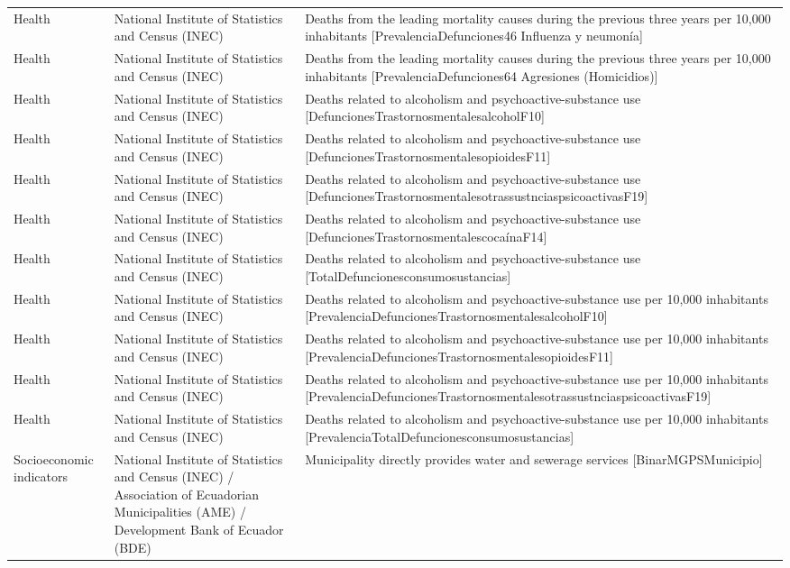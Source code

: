 \documentclass[10pt,a4paper]{article}
\begin{document}
\begin{longtable}{@{}>{\raggedright\arraybackslash}p{3.5cm}>{\raggedright\arraybackslash}p{5.6cm}>{\raggedright\arraybackslash}p{\dimexpr\textwidth-9.1cm-4\tabcolsep\relax}@{}}
Health & National Institute of Statistics and Census (INEC) & Deaths from the leading mortality causes during the previous three years per 10,000 inhabitants [PrevalenciaDefunciones46 Influenza y neumon\'{i}a]\\
Health & National Institute of Statistics and Census (INEC) & Deaths from the leading mortality causes during the previous three years per 10,000 inhabitants [PrevalenciaDefunciones64 Agresiones (Homicidios)]\\
Health & National Institute of Statistics and Census (INEC) & Deaths related to alcoholism and psychoactive-substance use [DefuncionesTrastornosmentalesalcoholF10]\\
Health & National Institute of Statistics and Census (INEC) & Deaths related to alcoholism and psychoactive-substance use [DefuncionesTrastornosmentalesopioidesF11]\\
Health & National Institute of Statistics and Census (INEC) & Deaths related to alcoholism and psychoactive-substance use [DefuncionesTrastornosmentalesotrassustnciaspsicoactivasF19]\\
Health & National Institute of Statistics and Census (INEC) & Deaths related to alcoholism and psychoactive-substance use [DefuncionesTrastornosmentalescoca\'{i}naF14]\\
Health & National Institute of Statistics and Census (INEC) & Deaths related to alcoholism and psychoactive-substance use [TotalDefuncionesconsumosustancias]\\
Health & National Institute of Statistics and Census (INEC) & Deaths related to alcoholism and psychoactive-substance use per 10,000 inhabitants [PrevalenciaDefuncionesTrastornosmentalesalcoholF10]\\
Health & National Institute of Statistics and Census (INEC) & Deaths related to alcoholism and psychoactive-substance use per 10,000 inhabitants [PrevalenciaDefuncionesTrastornosmentalesopioidesF11]\\
Health & National Institute of Statistics and Census (INEC) & Deaths related to alcoholism and psychoactive-substance use per 10,000 inhabitants [PrevalenciaDefuncionesTrastornosmentalesotrassustnciaspsicoactivasF19]\\
Health & National Institute of Statistics and Census (INEC) & Deaths related to alcoholism and psychoactive-substance use per 10,000 inhabitants [PrevalenciaTotalDefuncionesconsumosustancias]\\
Socioeconomic indicators & National Institute of Statistics and Census (INEC) / Association of Ecuadorian Municipalities (AME) / Development Bank of Ecuador (BDE) & Municipality directly provides water and sewerage services [BinarMGPSMunicipio]\\

\end{longtable}
\end{document}
